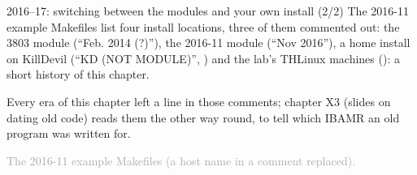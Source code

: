 \documentclass[aspectratio=169,11pt]{beamer}
\newcommand{\sourcecredit}[1]{\vfill\begin{flushright}\tiny\textcolor{DarkGray}{#1}\end{flushright}}
\begin{document}
\begin{frame}{2016--17: switching between the modules and your own install (2/2)}
\label{fr:switch2}
\small
The 2016-11 example Makefiles list four install locations, three of them commented out: the 3803 module (``Feb. 2014 (?)''), the 2016-11 module (``Nov 2016''), a home install on KillDevil (``KD (NOT MODULE)'', ) and the lab's THLinux machines (): a short history of this chapter.

\vspace{3mm}
\begin{punchbox}
\small Every era of this chapter left a line in those comments; chapter X3 (slides on dating old code) reads them the other way round, to tell which IBAMR an old program was written for.
\end{punchbox}
\sourcecredit{The 2016-11 example Makefiles (a host name in a comment replaced).}
\end{frame}
\end{document}
